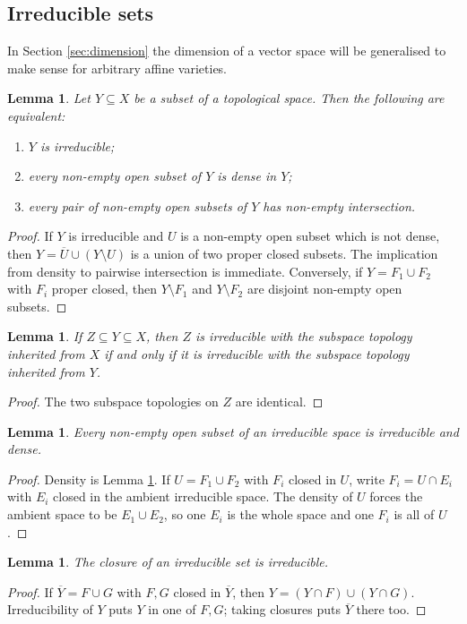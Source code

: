 \documentclass[12pt]{article}
\theoremstyle{plain}
\newtheorem{lemma}[thm]{Lemma}
\theoremstyle{definition}
\begin{document}
\subsection{Irreducible sets}\label{sec:irreducible}
In Section \ref{sec:dimension} the dimension of a vector space will be generalised to make sense for arbitrary affine varieties.
\begin{lemma}\label{lem:irred_criterion}
Let $Y\subseteq X$ be a subset of a topological space. Then the following are equivalent:
\begin{enumerate}
\item $Y$ is irreducible;
\item every non-empty open subset of $Y$ is dense in $Y$;
\item every pair of non-empty open subsets of $Y$ has non-empty intersection.
\end{enumerate}
\end{lemma}
\begin{proof}
If $Y$ is irreducible and $U$ is a non-empty open subset which is not dense, then $Y=\overline U\cup(Y\setminus U)$ is a union of two proper closed subsets. The implication from density to pairwise intersection is immediate. Conversely, if $Y=F_1\cup F_2$ with $F_i$ proper closed, then $Y\setminus F_1$ and $Y\setminus F_2$ are disjoint non-empty open subsets.
\end{proof}
\begin{lemma}\label{lem:irred_subspace_invariance}
If $Z\subseteq Y\subseteq X$, then $Z$ is irreducible with the subspace topology inherited from $X$ if and only if it is irreducible with the subspace topology inherited from $Y$.
\end{lemma}
\begin{proof}
The two subspace topologies on $Z$ are identical.
\end{proof}
\begin{lemma}\label{lem:open_irred_dense}
Every non-empty open subset of an irreducible space is irreducible and dense.
\end{lemma}
\begin{proof}
Density is Lemma \ref{lem:irred_criterion}. If $U=F_1\cup F_2$ with $F_i$ closed in $U$, write $F_i=U\cap E_i$ with $E_i$ closed in the ambient irreducible space. The density of $U$ forces the ambient space to be $E_1\cup E_2$, so one $E_i$ is the whole space and one $F_i$ is all of $U$.
\end{proof}
\begin{lemma}\label{lem:closure_irred}
The closure of an irreducible set is irreducible.
\end{lemma}
\begin{proof}
If $\overline Y=F\cup G$ with $F,G$ closed in $\overline Y$, then $Y=(Y\cap F)\cup(Y\cap G)$. Irreducibility of $Y$ puts $Y$ in one of $F,G$; taking closures puts $\overline Y$ there too.
\end{proof}
\end{document}
